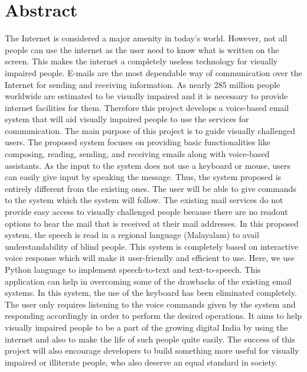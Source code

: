 \documentclass[12pt]{report}
\begin{document}
\chapter*{Abstract}
\thispagestyle{empty}
The Internet is considered a major amenity in today’s world. However, not all people can use the internet as the user need to know what is written on the screen. This makes the internet a completely useless technology for visually impaired people. E-mails are the most dependable way of communication over the Internet for sending and receiving information. As nearly 285 million people worldwide are estimated to be visually impaired and it is necessary to provide internet facilities for them. Therefore this project develops a voice-based email system that will aid visually impaired people to use the services for communication. \newline \newline
The main purpose of this project is to guide visually challenged users. The proposed system focuses on providing basic functionalities like composing, reading, sending, and receiving emails along with voice-based assistants. As the input to the system does not use a keyboard or mouse, users can easily give input by speaking the message. Thus, the system proposed is entirely different from the existing ones. The user will be able to give commands to the system which the system will follow.\newline \newline
The existing mail services do not provide easy access to visually challenged people because there are no readout options to hear the mail that is received at their mail addresses. In this proposed system, the speech is read in a regional language (Malayalam) to avail understandability of blind people. This system is completely based on interactive voice response which will make it user-friendly and efficient to use. Here, we use Python language to implement speech-to-text and text-to-speech. \newline \newpage
This application can help in overcoming some of the drawbacks of the existing email systems. In this system, the use of the keyboard has been eliminated completely. The user only requires listening to the voice commands given by the system and responding accordingly in order to perform the desired operations. It aims to help visually impaired people to be a part of the growing digital India by using the internet and also to make the life of such people quite easily. The success of this project will also encourage developers to build something more useful for visually impaired or illiterate people, who also deserve an equal standard in society.
\tableofcontents
\listoffigures
\listoftables
\thispagestyle{empty}
\end{document}
